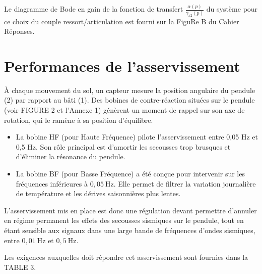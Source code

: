 Le diagramme de Bode en gain de la fonction de transfert $\frac{\alpha(p)}{\gamma_{x 2}(p)}$ du système pour ce choix du couple ressort/articulation est fourni sur la FiguRe B du Cahier Réponses.


\section{Performances de l'asservissement}
À chaque mouvement du sol, un capteur mesure la position angulaire du pendule (2) par rapport au bâti (1). Des bobines de contre-réaction situées sur le pendule (voir FIGURE 2 et l'Annexe 1) génèrent un moment de rappel sur son axe de rotation, qui le ramène à sa position d'équilibre.

\begin{itemize}
  \item La bobine HF (pour Haute Fréquence) pilote l'asservissement entre 0,05 Hz et 0,5 Hz. Son rôle principal est d'amortir les secousses trop brusques et d'éliminer la résonance du pendule.
  \item La bobine BF (pour Basse Fréquence) a été conçue pour intervenir sur les fréquences inférieures à $0,05 \mathrm{~Hz}$. Elle permet de filtrer la variation journalière de température et les dérives saisonnières plus lentes.
\end{itemize}

L'asservissement mis en place est donc une régulation devant permettre d'annuler en régime permanent les effets des secousses sismiques sur le pendule, tout en étant sensible aux signaux dans une large bande de fréquences d'ondes sismiques, entre $0,01 \mathrm{~Hz}$ et $0,5 \mathrm{~Hz}$.

Les exigences auxquelles doit répondre cet asservissement sont fournies dans la TABLE 3.


